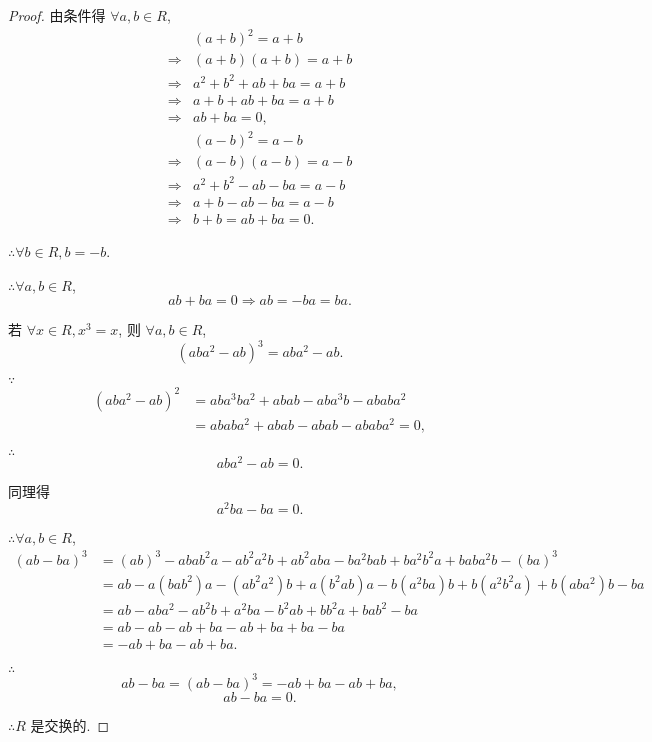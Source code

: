 \documentclass{ctexart}
\begin{document}
\begin{proof}
    由条件得 $\forall a,b\in R$,
    \begin{align*}
        & (a+b)^2=a+b \\
        \Rightarrow & (a+b)(a+b)=a+b \\
        \Rightarrow & a^2+b^2+ab+ba=a+b \\
        \Rightarrow & a+b+ab+ba=a+b \\
        \Rightarrow & ab+ba=0,
    \end{align*}
    \begin{align*}
        & (a-b)^2=a-b \\
        \Rightarrow & (a-b)(a-b)=a-b \\
        \Rightarrow & a^2+b^2-ab-ba=a-b \\
        \Rightarrow & a+b-ab-ba=a-b \\
        \Rightarrow & b+b=ab+ba=0.
    \end{align*}

    $\therefore\forall b\in R,b=-b$.

    $\therefore\forall a,b\in R$,
    \[ab+ba=0\Rightarrow ab=-ba=ba.\]

    若 $\forall x\in R,x^3=x$, 则 $\forall a,b\in R$,
    \[(aba^2-ab)^3=aba^2-ab.\]

    $\because$
    \begin{align*}
        (aba^2-ab)^2 & =aba^3ba^2+abab-aba^3b-ababa^2 \\
        & =ababa^2+abab-abab-ababa^2=0,
    \end{align*}

    $\therefore$
    \[aba^2-ab=0.\]

    同理得
    \[a^2ba-ba=0.\]

    $\therefore\forall a,b\in R$,
    \begin{align*}
        (ab-ba)^3 & =(ab)^3-abab^2a-ab^2a^2b+ab^2aba-ba^2bab+ba^2b^2a+baba^2b-(ba)^3 \\
        & =ab-a(bab^2)a-(ab^2a^2)b+a(b^2ab)a-b(a^2ba)b+b(a^2b^2a)+b(aba^2)b-ba \\
        & =ab-aba^2-ab^2b+a^2ba-b^2ab+bb^2a+bab^2-ba \\
        & =ab-ab-ab+ba-ab+ba+ba-ba \\
        & =-ab+ba-ab+ba.
    \end{align*}

    $\therefore$
    \[ab-ba=(ab-ba)^3=-ab+ba-ab+ba,\]
    \[ab-ba=0.\]

    $\therefore R$ 是交换的.
\end{proof}
\end{document}

